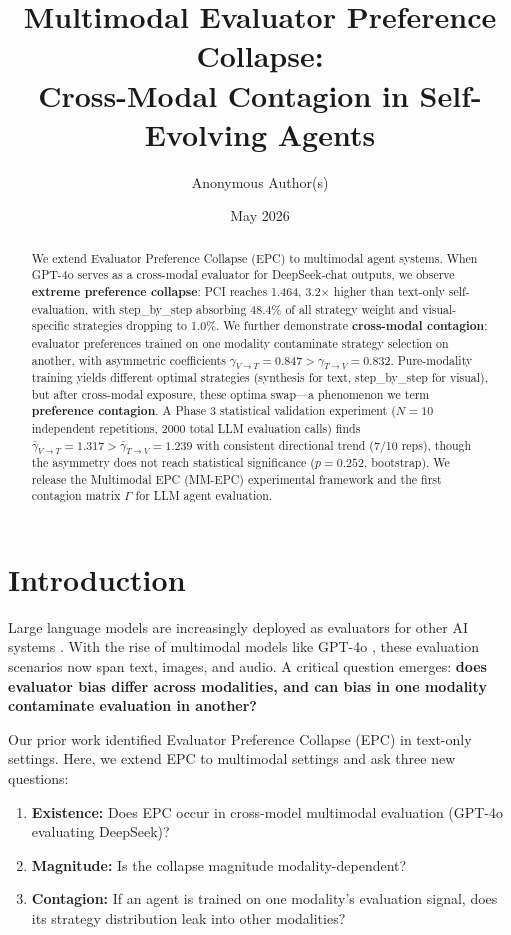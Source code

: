 \documentclass[11pt,a4paper]{article}
\title{\Large\textbf{Multimodal Evaluator Preference Collapse: \\Cross-Modal Contagion in Self-Evolving Agents}}
\author{Anonymous Author(s)}
\date{May 2026}
\begin{document}
\maketitle

\begin{abstract}
We extend Evaluator Preference Collapse (EPC) to multimodal agent systems. When GPT-4o serves as a cross-modal evaluator for DeepSeek-chat outputs, we observe \textbf{extreme preference collapse}: PCI reaches 1.464, 3.2$\times$ higher than text-only self-evaluation, with step\_by\_step absorbing 48.4\% of all strategy weight and visual-specific strategies dropping to 1.0\%. We further demonstrate \textbf{cross-modal contagion}: evaluator preferences trained on one modality contaminate strategy selection on another, with asymmetric coefficients $\gamma_{V\to T}=0.847 > \gamma_{T\to V}=0.832$. Pure-modality training yields different optimal strategies (synthesis for text, step\_by\_step for visual), but after cross-modal exposure, these optima swap---a phenomenon we term \textbf{preference contagion}. A Phase 3 statistical validation experiment ($N=10$ independent repetitions, 2000 total LLM evaluation calls) finds $\bar{\gamma}_{V\to T}=1.317 > \bar{\gamma}_{T\to V}=1.239$ with consistent directional trend (7/10 reps), though the asymmetry does not reach statistical significance ($p=0.252$, bootstrap). We release the Multimodal EPC (MM-EPC) experimental framework and the first contagion matrix $\Gamma$ for LLM agent evaluation.
\end{abstract}

\section{Introduction}

Large language models are increasingly deployed as evaluators for other AI systems \cite{zheng2023judging, chiang2024chatbot}. With the rise of multimodal models like GPT-4o \cite{openai2024gpt4o}, these evaluation scenarios now span text, images, and audio. A critical question emerges: \textbf{does evaluator bias differ across modalities, and can bias in one modality contaminate evaluation in another?}

Our prior work identified Evaluator Preference Collapse (EPC) in text-only settings. Here, we extend EPC to multimodal settings and ask three new questions:

\begin{enumerate}[leftmargin=*]
    \item \textbf{Existence:} Does EPC occur in cross-model multimodal evaluation (GPT-4o evaluating DeepSeek)?
    \item \textbf{Magnitude:} Is the collapse magnitude modality-dependent?
    \item \textbf{Contagion:} If an agent is trained on one modality's evaluation signal, does its strategy distribution leak into other modalities?
\end{enumerate}
\end{document}
